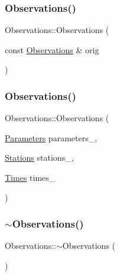 \subsubsection{\texorpdfstring{Observations()}{Observations()}\hspace{0.1cm}{\footnotesize\ttfamily [2/3]}}
{\footnotesize\ttfamily Observations\+::\+Observations (\begin{DoxyParamCaption}\item[{const \mbox{\hyperlink{class_observations}{Observations}} \&}]{orig }\end{DoxyParamCaption})\hspace{0.3cm}{\ttfamily [delete]}}

\mbox{\label{class_observations_a67aabf1b5bb51b8bcb9f6cf3df64f57d}} 
\subsubsection{\texorpdfstring{Observations()}{Observations()}\hspace{0.1cm}{\footnotesize\ttfamily [3/3]}}
{\footnotesize\ttfamily Observations\+::\+Observations (\begin{DoxyParamCaption}\item[{\mbox{\hyperlink{class_parameters}{Parameters}}}]{parameters\+\_\+,  }\item[{\mbox{\hyperlink{class_stations}{Stations}}}]{stations\+\_\+,  }\item[{\mbox{\hyperlink{class_times}{Times}}}]{times\+\_\+ }\end{DoxyParamCaption})}

\mbox{\label{class_observations_a8724b267cce796b0f77f8f2b9e4aaf1d}} 
\subsubsection{\texorpdfstring{$\sim$\+Observations()}{~Observations()}}
{\footnotesize\ttfamily Observations\+::$\sim$\+Observations (\begin{DoxyParamCaption}{ }\end{DoxyParamCaption})\hspace{0.3cm}{\ttfamily [virtual]}}




